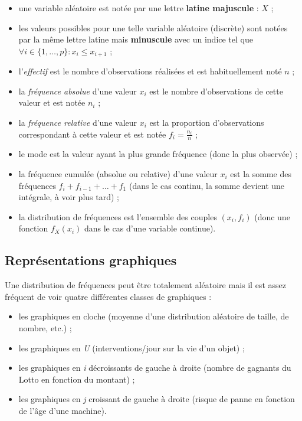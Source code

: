 \documentclass{article}
\begin{document}
		\begin{itemize}
			\item une variable aléatoire est notée par une lettre \textbf{latine majuscule} : $X$ ;
			\item les valeurs possibles pour une telle variable aléatoire (discrète) sont notées par la même lettre latine mais \textbf{minuscule} avec un indice tel que
				  $\forall i \in \{1, \ldots, p\} : x_i \leq x_{i+1}$ ;
			\item l'\textit{effectif} est le nombre d'observations réalisées et est habituellement noté $n$ ;
			\item la \textit{fréquence absolue} d'une valeur $x_i$ est le nombre d'observations de cette valeur et est notée $n_i$ ;
			\item la \textit{fréquence relative} d'une valeur $x_i$ est la proportion d'observations correspondant à cette valeur et est notée $f_i = \frac {n_i}n$ ;
			\item le mode est la valeur ayant la plus grande fréquence (donc la plus observée) ;
			\item la fréquence cumulée (absolue ou relative) d'une valeur $x_i$ est la somme des fréquences $f_i + f_{i-1} + \ldots + f_1$ (dans le cas continu, la somme
				  devient une intégrale, à voir plus tard) ;
			\item la distribution de fréquences est l'ensemble des couples $(x_i, f_i)$ (donc une fonction $f_X(x_i)$ dans le cas d'une variable continue).
		\end{itemize}

	\subsection{Représentations graphiques}
		Une distribution de fréquences peut être totalement aléatoire mais il est assez fréquent de voir quatre différentes classes de graphiques :

		\begin{itemize}
			\item les graphiques en cloche (moyenne d'une distribution aléatoire de taille, de nombre, etc.) ;
			\item les graphiques en \textit{U} (interventions/jour sur la vie d'un objet) ;
			\item les graphiques en \textit{i} décroissants de gauche à droite (nombre de gagnants du Lotto en fonction du montant) ;
			\item les graphiques en \textit{j} croissant de gauche à droite (risque de panne en fonction de l'âge d'une machine).
		\end{itemize}
\end{document}
